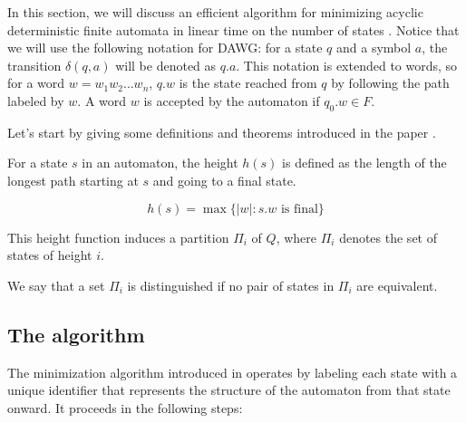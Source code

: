 In this section, we will discuss an efficient algorithm for minimizing acyclic deterministic finite automata in linear time on the number of states \cite{revuz1992minimisation}. Notice that we will use the following notation for DAWG: for a state $q$ and a symbol $a$, the transition $\delta(q,a)$ will be denoted as $q.a$. This notation is extended to words, so for a word $w = w_1w_2\dots w_n$, $q.w$ is the state reached from $q$ by following the path labeled by $w$. A word $w$ is accepted by the automaton if $q_0.w \in F$.

Let's start by giving some definitions and theorems introduced in the paper \cite{revuz1992minimisation}.

\begin{definition}
    For a state $s$ in an automaton, the height $h(s)$ is defined as the length of the longest path starting at $s$ and going to a final state. 

    $$h(s) = \max\{|w|:s.w \text{ is final}\}$$
\end{definition}

This height function induces a partition $\Pi_i$ of $Q$, where $\Pi_i$ denotes the set of states of height $i$.

\begin{definition}
    We say that a set $\Pi_i$ is distinguished if no pair of states in $\Pi_i$ are equivalent.
\end{definition}

\subsection{The algorithm}
The minimization algorithm introduced in \cite{revuz1992minimisation} operates by labeling each state with a unique identifier that represents the structure of the automaton from that state onward. It proceeds in the following steps:

